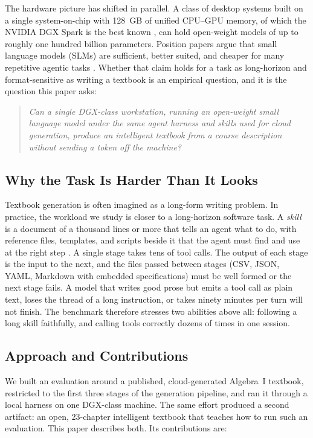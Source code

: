 \documentclass[11pt]{article}
\begin{document}
The hardware picture has shifted in parallel. A class of desktop systems built on a single system-on-chip with 128~GB of unified CPU--GPU memory, of which the NVIDIA DGX Spark is the best known \cite{nvidia2025dgxspark}, can hold open-weight models of up to roughly one hundred billion parameters. Position papers argue that small language models (SLMs) are sufficient, better suited, and cheaper for many repetitive agentic tasks \cite{belcak2025slm}. Whether that claim holds for a task as long-horizon and format-sensitive as writing a textbook is an empirical question, and it is the question this paper asks:

\begin{quote}
\textit{Can a single DGX-class workstation, running an open-weight small language model under the same agent harness and skills used for cloud generation, produce an intelligent textbook from a course description without sending a token off the machine?}
\end{quote}

\subsection{Why the Task Is Harder Than It Looks}

Textbook generation is often imagined as a long-form writing problem. In practice, the workload we study is closer to a long-horizon software task. A \textit{skill} is a document of a thousand lines or more that tells an agent what to do, with reference files, templates, and scripts beside it that the agent must find and use at the right step \cite{anthropic2025skills}. A single stage takes tens of tool calls. The output of each stage is the input to the next, and the files passed between stages (CSV, JSON, YAML, Markdown with embedded specifications) must be well formed or the next stage fails. A model that writes good prose but emits a tool call as plain text, loses the thread of a long instruction, or takes ninety minutes per turn will not finish. The benchmark therefore stresses two abilities above all: following a long skill faithfully, and calling tools correctly dozens of times in one session.

\subsection{Approach and Contributions}

We built an evaluation around a published, cloud-generated Algebra~I textbook, restricted to the first three stages of the generation pipeline, and ran it through a local harness on one DGX-class machine. The same effort produced a second artifact: an open, 23-chapter intelligent textbook that teaches how to run such an evaluation. This paper describes both. Its contributions are:
\end{document}
